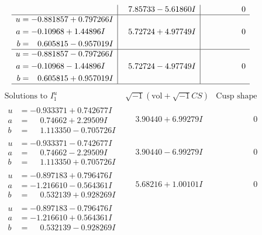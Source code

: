 \documentclass[1p]{elsarticle_modified}
\theoremstyle{definition}
\newcommand{\I}{\sqrt{-1}}
\begin{document}
$$\begin{array}{c|c|c}
 & \phantom{-}7.85733 - 5.61860 I & \phantom{-0.000000 } 0 \\ \hline\begin{aligned}
u &= -0.881857 + 0.797266 I \\
a &= -0.10968 + 1.44896 I \\
b &= \phantom{-}0.605815 - 0.957019 I\end{aligned}
 & \phantom{-}5.72724 + 4.97749 I & \phantom{-0.000000 } 0 \\ \hline\begin{aligned}
u &= -0.881857 - 0.797266 I \\
a &= -0.10968 - 1.44896 I \\
b &= \phantom{-}0.605815 + 0.957019 I\end{aligned}
 & \phantom{-}5.72724 - 4.97749 I & \phantom{-0.000000 } 0\\
 \hline 
 \end{array}$$\newpage$$\begin{array}{c|c|c}  
\text{Solutions to }I^u_{1}& \I (\text{vol} + \sqrt{-1}CS) & \text{Cusp shape}\\
 \hline 
\begin{aligned}
u &= -0.933371 + 0.742677 I \\
a &= \phantom{-}0.74662 + 2.29509 I \\
b &= \phantom{-}1.113350 - 0.705726 I\end{aligned}
 & \phantom{-}3.90440 + 6.99279 I & \phantom{-0.000000 } 0 \\ \hline\begin{aligned}
u &= -0.933371 - 0.742677 I \\
a &= \phantom{-}0.74662 - 2.29509 I \\
b &= \phantom{-}1.113350 + 0.705726 I\end{aligned}
 & \phantom{-}3.90440 - 6.99279 I & \phantom{-0.000000 } 0 \\ \hline\begin{aligned}
u &= -0.897183 + 0.796476 I \\
a &= -1.216610 - 0.564361 I \\
b &= \phantom{-}0.532139 + 0.928269 I\end{aligned}
 & \phantom{-}5.68216 + 1.00101 I & \phantom{-0.000000 } 0 \\ \hline\begin{aligned}
u &= -0.897183 - 0.796476 I \\
a &= -1.216610 + 0.564361 I \\
b &= \phantom{-}0.532139 - 0.928269 I\end{aligned}

\end{array}$$
\end{document}
